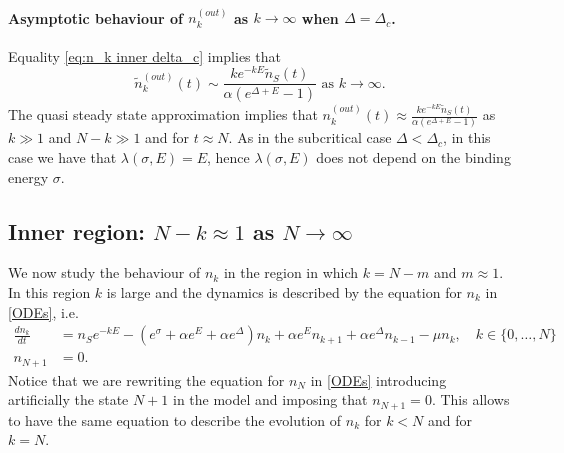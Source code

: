 \documentclass{article}
\numberwithin{equation}{section}
\theoremstyle{plain}
\begin{document}
 \paragraph{Asymptotic behaviour of $n_k^{(out)}$ as $k \to \infty $ when $\Delta =  \Delta_c $.}
 Equality \eqref{eq:n_k inner delta_c} implies that
  \begin{equation} \label{k large N-k large delta c}
 \tilde{n}_k^{(out)} (t) \sim  \frac{ k e^{-k E } \tilde{n}_S(t) }{ \alpha (e^{\Delta + E}  -1 )}\text{ as } k \to \infty. 
 \end{equation}
 The quasi steady state approximation implies that $ n_k^{(out)} (t) \approx  \frac{ k e^{-k E } \tilde{n}_S(t) }{ \alpha (e^{\Delta + E}  -1 )}$ as $k \gg 1 $ and $N-k \gg 1 $ and for $t \approx N $. 
As in the subcritical case $\Delta < \Delta_c $, in this case we have that $\lambda (\sigma, E) = E$, hence $\lambda (\sigma, E) $ does not depend on the binding energy $\sigma$. 
 

\subsection{Inner region: $N-k  \approx 1 $ as $N \to \infty$}
We now study the behaviour of $n_k $  in the region in which $k = N-m $ and $m \approx 1 $.
In this region $k $ is large and the dynamics is described by the equation for $n_k $ in \eqref{ODEs}, i.e.  
\begin{align}\label{eq stationary inner1}
        \frac{d n_k }{dt} &= n_S e^{- k E} - \left( e^{\sigma } + \alpha e^E + \alpha e^\Delta  \right)  n_k + \alpha e^E n_{k+1}  + \alpha e^{\Delta} n_{k-1} - \mu n_k, \quad k \in \{0, \dots, N  \}  \\
       n_{ N+1}&=0. \nonumber 
\end{align}
Notice that we are rewriting the equation for $n_N $ in \eqref{ODEs} introducing artificially the state $N+1$ in the model and imposing that $n_{N+1}=0$. This allows to have the same equation to describe the evolution of $n_k $ for $k < N $ and for $k =N $. 
\end{document}
